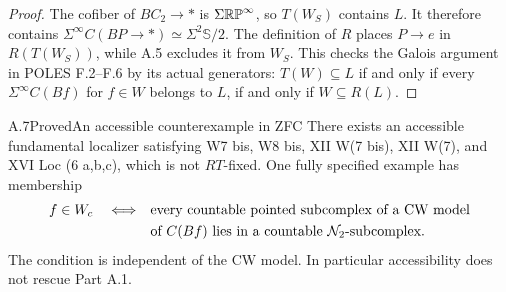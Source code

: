 \begin{proof}
The cofiber of $B C_2\to *$ is $\Sigma\mathbb{RP}^\infty$, so $T(W_S)$ contains $L$. It therefore contains $\Sigma^\infty C(BP\to*)\simeq\Sigma^2\mathbb S/2$. The definition of $R$ places $P\to e$ in $R(T(W_S))$, while A.5 excludes it from $W_S$. This checks the Galois argument in POLES F.2--F.6 by its actual generators: $T(W)\subseteq L$ if and only if every $\Sigma^\infty C(Bf)$ for $f\in W$ belongs to $L$, if and only if $W\subseteq R(L)$.
\end{proof}

\begin{claim}{A.7}{Proved}{An accessible counterexample in ZFC}\label{A7}
There exists an accessible fundamental localizer satisfying W7 bis, W8 bis, XII W(7 bis), XII W(7), and XVI Loc (6 a,b,c), which is not $RT$-fixed. One fully specified example has membership
\[
 \begin{split}
 f\in W_c\quad\Longleftrightarrow\quad&
 \text{every countable pointed subcomplex of a CW model}\\
 &\text{of }C(Bf)\text{ lies in a countable }\mathcal N_2\text{-subcomplex}.
 \end{split}
\]
The condition is independent of the CW model. In particular accessibility does not rescue Part A.1.
\end{claim}
